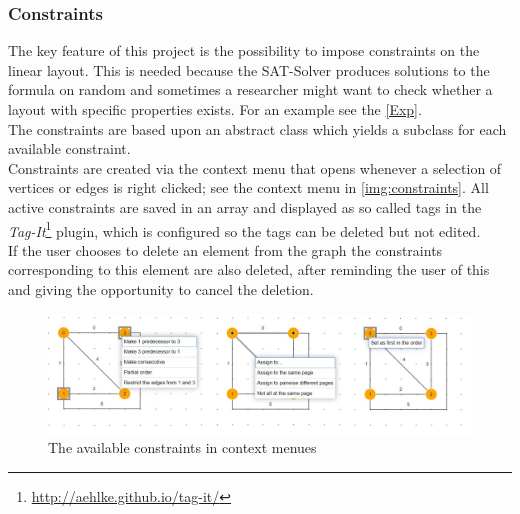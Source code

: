 \subsubsection{Constraints}
\label{imp_constr}
The key feature of this project is the possibility to impose constraints on the linear layout. This is needed because the SAT-Solver produces solutions to the formula on random and sometimes a researcher might want to check whether a layout with specific properties exists. For an example see the \autoref{Exp}.\\
The constraints are based upon an abstract class which yields a subclass for each available constraint.\\
Constraints are created via the context menu that opens whenever a selection of vertices or edges is right clicked; see the context menu in \autoref{img:constraints}.
All active constraints are saved in an array and displayed as so called tags in the \textit{Tag-It}\footnote{\url{http://aehlke.github.io/tag-it/}} plugin, which is configured so the tags can be deleted but not edited.\\
If the user chooses to delete an element from the graph the constraints corresponding to this element are also deleted, after reminding the user of this and giving the opportunity to cancel the deletion.
\begin{figure}
\begin{center}
\includegraphics[width=\textwidth]{figures/figIndex/Constraints.jpg}
\caption{The available constraints in context menues}
\label{img:constraints}
\end{center}
\end{figure}
